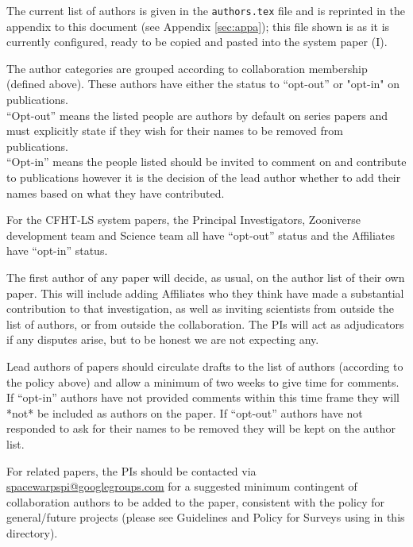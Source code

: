 \documentclass[a4paper]{article}
\begin{document}
The current list of \sw authors is given in the \texttt{authors.tex} file and is reprinted
in the appendix to this document (see Appendix \ref{sec:appa}); this file shown is as it is currently configured, ready to be copied and pasted into the \sw system paper (\sw I). 

\noindent The author categories are grouped according to collaboration membership (defined above). These authors have either the status to ``opt-out'' or "opt-in" on \sw publications.  \\
``Opt-out'' means the listed people are authors by default on \sw series papers and must explicitly state if they wish for their names to be removed from \sw publications. \\
``Opt-in'' means the people listed should be invited to comment on and contribute to publications however it is the decision of the lead author whether to add their names based on what they have contributed.

For the CFHT-LS \sw system papers, the Principal Investigators, Zooniverse development team and \sw Science team all have ``opt-out'' status and the \sw Affiliates have ``opt-in'' status.

The first author of any \sw paper will decide, as usual, on the author list of their own paper. This will include adding Affiliates who they think have made a substantial contribution to that investigation, as well as inviting scientists from outside the list of \sw authors, or from outside the
collaboration.  The \sw PIs will act as adjudicators if any disputes arise, but to be honest we are not expecting any.

Lead authors of \sw papers should circulate drafts to the list of \sw authors (according to the policy above) and allow a minimum of two weeks to give time for comments. If  ``opt-in'' authors have not provided comments within this time frame they will *not* be included as authors on the paper. If ``opt-out'' authors have not responded to ask for their names to be removed they will be kept on the author list.



For \sw related papers, the \sw PIs should be contacted via \href{mailto:spacewarpspi@googlegroups.com}{spacewarpspi@googlegroups.com} for a suggested minimum contingent of collaboration authors to be added to the paper, consistent with the policy for general/future \sw projects (please see Guidelines and Policy for Surveys using \sw in this directory). 


\end{document}
